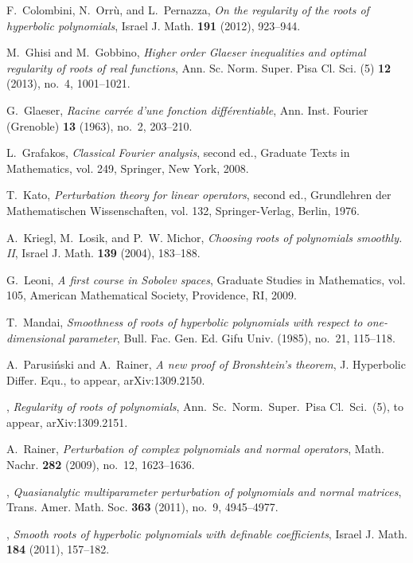 \documentclass[12pt]{amsart}
\theoremstyle{plain}
\theoremstyle{definition}
\numberwithin{equation}{section}
\begin{document}
\begin{thebibliography}{10}
F.~Colombini, N.~Orr{{\`u}}, and L.~Pernazza, \emph{On the regularity of the
  roots of hyperbolic polynomials}, Israel J. Math. \textbf{191} (2012),
  923--944. 

M.~Ghisi and M.~Gobbino, \emph{Higher order {G}laeser inequalities and optimal
  regularity of roots of real functions}, Ann. Sc. Norm. Super. Pisa Cl. Sci.
  (5) \textbf{12} (2013), no.~4, 1001--1021. 

G.~Glaeser, \emph{Racine carr\'ee d'une fonction diff\'erentiable}, Ann. Inst.
  Fourier (Grenoble) \textbf{13} (1963), no.~2, 203--210.

L.~Grafakos, \emph{Classical {F}ourier analysis}, second ed., Graduate Texts in
  Mathematics, vol. 249, Springer, New York, 2008. 

T.~Kato, \emph{Perturbation theory for linear operators}, second ed.,
  Grundlehren der Mathematischen Wissenschaften, vol. 132, Springer-Verlag,
  Berlin, 1976.

A.~Kriegl, M.~Losik, and P.~W. Michor, \emph{Choosing roots of polynomials
  smoothly. {II}}, Israel J. Math. \textbf{139} (2004), 183--188.

G.~Leoni, \emph{A first course in {S}obolev spaces}, Graduate Studies in
  Mathematics, vol. 105, American Mathematical Society, Providence, RI, 2009.
  

T.~Mandai, \emph{Smoothness of roots of hyperbolic polynomials with respect to
  one-dimensional parameter}, Bull. Fac. Gen. Ed. Gifu Univ. (1985), no.~21,
  115--118.

A.~Parusi{{\'n}}ski and A.~Rainer, \emph{A new proof of {B}ronshtein's
  theorem}, J. Hyperbolic Differ. Equ., to appear, ar{X}iv:1309.2150.

\bysame, \emph{Regularity of roots of polynomials}, Ann.\ Sc.\ Norm.\ Super.\
  Pisa Cl.\ Sci.\ (5), to appear, ar{X}iv:1309.2151.

A.~Rainer, \emph{Perturbation of complex polynomials and normal operators},
  Math. Nachr. \textbf{282} (2009), no.~12, 1623--1636. 
  

\bysame, \emph{Quasianalytic multiparameter perturbation of polynomials and
  normal matrices}, Trans. Amer. Math. Soc. \textbf{363} (2011), no.~9,
  4945--4977.

\bysame, \emph{Smooth roots of hyperbolic polynomials with definable
  coefficients}, Israel J. Math. \textbf{184} (2011), 157--182. 
  


\end{thebibliography}
\end{document}
